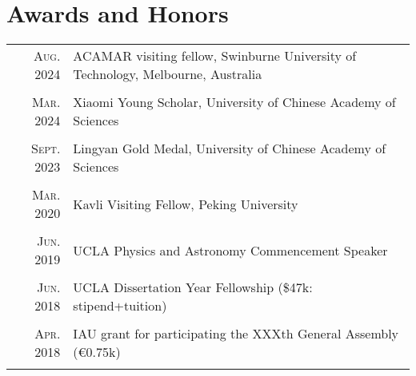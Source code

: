 \documentclass[letterpaper,10pt]{article}
\newcommand{\narrow}{-1.8ex}
\newcommand{\textwrap}{5.8in}       %
\begin{document}
\section{Awards and Honors}

\vspace*{-.5em}
\begin{longtable}{r|p{\textwrap}}
    \textsc{Aug. 2024} & ACAMAR visiting fellow, Swinburne University of Technology, Melbourne, Australia \\
    \multicolumn{2}{c}{} \\[\narrow]
    \textsc{Mar. 2024} & Xiaomi Young Scholar, University of Chinese Academy of Sciences \\
    \multicolumn{2}{c}{} \\[\narrow]
    \textsc{Sept. 2023} & Lingyan Gold Medal, University of Chinese Academy of Sciences \\
    \multicolumn{2}{c}{} \\[\narrow]
    \textsc{Mar. 2020} & Kavli Visiting Fellow, Peking University \\
    \multicolumn{2}{c}{} \\[\narrow]
    \textsc{Jun. 2019} & UCLA Physics and Astronomy Commencement Speaker  \\
    \multicolumn{2}{c}{} \\[\narrow]
    \textsc{Jun. 2018} & UCLA Dissertation Year Fellowship (\$47k: stipend+tuition)    \\
    \multicolumn{2}{c}{} \\[\narrow]
    \textsc{Apr. 2018} & IAU grant for participating the XXXth General Assembly (\euro0.75k)  \\
    \multicolumn{2}{c}{} \\[\narrow]

\end{longtable}
\end{document}
